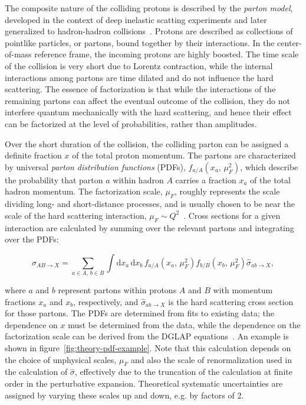 The composite nature of the colliding protons is described by the \emph{parton model}, developed in the context of deep inelastic scatting experiments and later generalized to hadron-hadron collisions~\cite{Bjorken:1969ja,feynmanparton,Drell:1970yt}. Protons are described as collections of pointlike particles, or partons, bound together by their interactions. In the center-of-mass reference frame, the incoming protons are highly boosted. The time scale of the collision is very short due to Lorentz contraction, while the internal interactions among partons are time dilated and do not influence the hard scattering. The essence of factorization is that while the interactions of the remaining partons can affect the eventual outcome of the collision, they do not interfere quantum mechanically with the hard scattering, and hence their effect can be factorized at the level of probabilities, rather than amplitudes.

Over the short duration of the collision, the colliding parton can be assigned a definite fraction $x$ of the total proton momentum. The partons are characterized by universal \emph{parton distribution functions} (PDFs), $f_{a/A}(x_a,\,\mu_F^2)$, which describe the probability that parton $a$ within hadron $A$ carries a fraction $x_a$ of the total hadron momentum. The factorization scale, $\mu_F$, roughly represents the scale dividing long- and short-distance processes, and is usually chosen to be near the scale of the hard scattering interaction, $\mu_F\sim Q^2$~\cite{Campbell:2006jf}. Cross sections for a given interaction are calculated by summing over the relevant partons and integrating over the PDFs:

\begin{equation}
	\sigma_{AB\rightarrow X} = \sum_{a\in A,\,b\in B}\int \mathrm{d}x_a\, \mathrm{d}x_b\, f_{a/A}(x_a,\,\mu_F^2) f_{b/B}(x_b,\,\mu_F^2) \hat{\sigma}_{ab\rightarrow X},
\end{equation}

where $a$ and $b$ represent partons within protons $A$ and $B$ with momentum fractions $x_a$ and $x_b$, respectively, and $\hat{\sigma}_{ab\rightarrow X}$ is the hard scattering cross section for those partons. The PDFs are determined from fits to existing data; the dependence on $x$ must be determined from the data, while the dependence on the factorization scale can be derived from the DGLAP equations~\cite{Gribov:1972ri,Dokshitzer:1977sg,Altarelli:1977zs}. An example is shown in figure~\ref{fig:theory-pdf-example}. Note that this calculation depends on the choice of unphysical scales, $\mu_F$ and also the scale of renormalization used in the calculation of $\hat{\sigma}$, effectively due to the truncation of the calculation at finite order in the perturbative expansion. Theoretical systematic uncertainties are assigned by varying these scales up and down, e.g. by factors of 2. 

